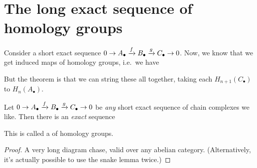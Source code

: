 \section{The long exact sequence of homology groups}
Consider a short exact sequence $0 \to A_\bullet \xrightarrow{f} B_\bullet \xrightarrow{g} C_\bullet \to 0$.
Now, we know that we get induced maps of homology groups, i.e.\ we have
\begin{center}
\end{center}
But the theorem is that we can string these all together,
taking each $H_{n+1}(C_\bullet)$ to $H_n(A_\bullet)$.

\begin{theorem}
	\label{thm:long_exact}
	Let $0 \to A_\bullet \xrightarrow{f} B_\bullet \xrightarrow{g} C_\bullet \to 0$ 
	be \emph{any} short exact sequence of chain complexes we like.
	Then there is an \emph{exact} sequence
	\begin{center}
	\end{center}
	This is called a  of homology groups.
\end{theorem}
\begin{proof}
	A very long diagram chase, valid over any abelian category.
	(Alternatively, it's actually possible to use the snake lemma twice.)
\end{proof}

